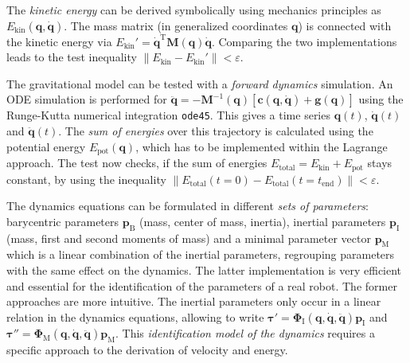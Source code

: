 \documentclass[runningheads]{llncs}
\newcommand{\transp}[0]{{\mathrm{T}}}
\begin{document}
\begin{test}\label{test:ser_dyn_inertia_ekin}
The \emph{kinetic energy} can be derived symbolically using mechanics principles as $E_\mathrm{kin}(\bm{q},\dot{\bm{q}})$.
The mass matrix (in generalized coordinates $\bm{q}$) is connected with the kinetic energy via $E_\mathrm{kin}'{=}\dot{\bm{q}}^\transp \bm{M}(\bm{q}) \dot{\bm{q}}$.
Comparing the two implementations leads to the test inequality $\lVert E_\mathrm{kin}{-}E_\mathrm{kin}' \rVert {<} \varepsilon$.
\end{test}


\begin{test}\label{test:ser_dyn_energy}
The gravitational model can be tested with a \emph{forward dynamics} simulation.
An ODE simulation is performed for  $\ddot{\bm{q}}{=}{-}\bm{M}^{-1}(\bm{q})[\bm{c}(\bm{q},\dot{\bm{q}}){+}\bm{g}(\bm{q})]$ using the Runge-Kutta numerical integration \texttt{ode45}.
This gives a time series $\bm{q}(t)$, $\dot{\bm{q}}(t)$ and $\ddot{\bm{q}}(t)$.
The \emph{sum of energies} over this trajectory is calculated using the potential energy $E_\mathrm{pot}(\bm{q})$, which has to be implemented within the Lagrange approach.
The test now checks, if the sum of energies $E_\mathrm{total}{=}E_\mathrm{kin}{+}E_\mathrm{pot}$ stays constant, by using the inequality $\lVert E_\mathrm{total}(t{=}0){-}E_\mathrm{total}(t{=}t_\mathrm{end}) \rVert {<} \varepsilon$.
\end{test}


\begin{property}\label{prop:ser_dynpar}
The dynamics equations can be formulated in different \emph{sets of parameters}: barycentric parameters $\bm{p}_\mathrm{B}$ (mass, center of mass, inertia), inertial parameters $\bm{p}_\mathrm{I}$ (mass, first and second moments of mass) and a minimal parameter vector $\bm{p}_\mathrm{M}$ which is a linear combination of the inertial parameters, regrouping parameters with the same effect on the dynamics.
The latter implementation is very efficient and essential for the identification of the parameters of a real robot.
The former approaches are more intuitive.
The inertial parameters only occur in a linear relation in the dynamics equations, allowing to write $\bm{\tau}'{=}\bm{\Phi}_\mathrm{I}(\bm{q},\dot{\bm{q}},\ddot{\bm{q}})\bm{p}_\mathrm{I}$ and $\bm{\tau}''{=}\bm{\Phi}_\mathrm{M}(\bm{q},\dot{\bm{q}},\ddot{\bm{q}})\bm{p}_\mathrm{M}$.
This \emph{identification model of the dynamics} requires a specific approach to the derivation of velocity and energy.
\end{property}
\end{document}
